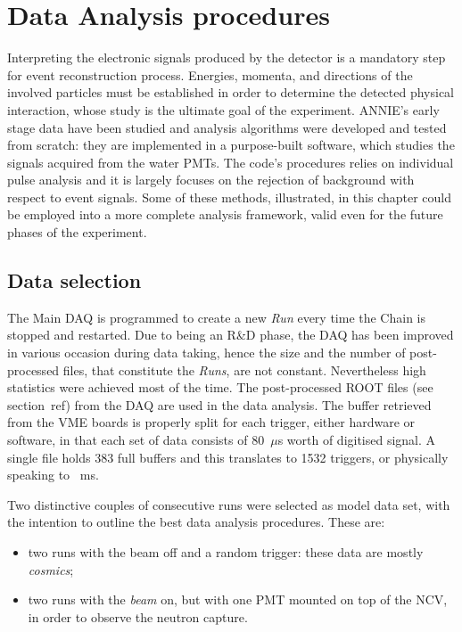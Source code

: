 
\chapter{Data Analysis procedures}
\label{cha:methdod}

 Interpreting the electronic signals produced by the detector is a mandatory step for event reconstruction %
 process.
 Energies, momenta, and directions of the involved particles must be established in order to determine %
 the detected physical interaction, whose study is the ultimate goal of the experiment.
 ANNIE's early stage data have been studied and analysis algorithms were developed and tested from scratch: %
 they are implemented in a purpose-built software, which studies the signals acquired from the water PMTs.
 The code's procedures relies on individual pulse analysis and it is largely focuses on the rejection of %
 background with respect to event signals.
 Some of these methods, illustrated, in this chapter could be employed into a more complete analysis %
 framework, valid even for the future phases of the experiment.

\section{Data selection}
\label{sec:data}

 The Main DAQ is programmed to create a new \emph{Run} every time the Chain is stopped and restarted.
 Due to being an R\&D phase, the DAQ has been improved in various occasion during data taking, %
 hence the size and the number of post-processed files, that constitute the \emph{Runs}, are not constant.
 Nevertheless high statistics were achieved most of the time.
 The post-processed ROOT files (see section~ref) from the DAQ are used in the data analysis.
 The buffer retrieved from the VME boards is properly split for each trigger, either hardware or software, %
 in that each set of data consists of 80~$\mu$s worth of digitised signal.
 A single file holds 383 full buffers and this translates to 1532 triggers, or physically speaking to ~ms.

 Two distinctive couples of consecutive runs were selected as model data set, with the intention to %
 outline the best data analysis procedures.
 These are:
\begin{itemize}
  \item two runs with the beam off and a random trigger: these data are mostly \emph{cosmics};
  \item two runs with the \emph{beam} on, but with one PMT mounted on top of the NCV, in order to %
    observe the neutron capture.
\end{itemize}

